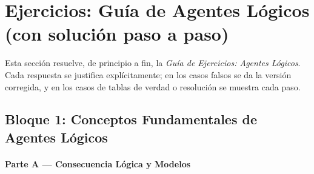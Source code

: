 \section{Ejercicios: Guía de Agentes Lógicos (con solución paso a paso)}

Esta sección resuelve, de principio a fin, la \textit{Guía de Ejercicios: Agentes Lógicos}. Cada
respuesta se justifica explícitamente; en los casos falsos se da la versión corregida, y en los
casos de tablas de verdad o resolución se muestra cada paso.

\subsection{Bloque 1: Conceptos Fundamentales de Agentes Lógicos}

\paragraph{Parte A --- Consecuencia Lógica y Modelos}

